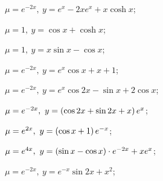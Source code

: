 \begin{enumsols}
		\label{sol:bvp_green:green_lifting_hard}
		\item \( \mu = e^{-2x}, ~ y = e^x - 2x e^x + x \cosh{x} \); %
		\item \( \mu = 1, ~ y = \cos{x} + \cosh{x} \); %
		\item \( \mu = 1, ~ y = x \sin{x} - \cos{x} \); %
		\item \( \mu = e^{-2x}, ~ y = e^x \cos{x} + x + 1 \); %
		\item \( \mu = e^{-2x}, ~ y = e^x \cos{2x} - \sin{x} + 2 \cos{x} \); %
		\item \( \mu = e^{-2x}, ~ y = \left( \cos{2x} + \sin{2 x} + x \right) e^x \); %
		\item \( \mu = e^{2x}, ~ y = \left( \cos{x} + 1 \right) e^{- x} \); %
		\item \( \mu = e^{4x}, ~ y = \left( \sin{x} - \cos{x} \right) \cdot e^{-2x} + xe^x \); %
		
		\item \( \mu = e^{-2x}, ~ y = e^{-x} \sin{2x} + x^2 \); %
		

\end{enumsols}
